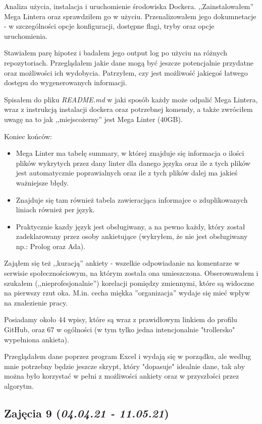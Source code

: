 \documentclass[graybox]{svmult}
\begin{document}
Analiza użycia, instalacja i uruchomienie środowiska Dockera. ,,Zainstalowałem'' Mega Lintera oraz sprawdziłem go w użyciu. Przenalizowałem jego dokumnetacje - w szczególności opcje konfiguracji, dostępne flagi, tryby oraz opcje uruchomienia.

Stawiałem parę hipotez i badałem jego output log po użyciu na różnych repozytoriach. Przeglądałem jakie dane mogą być jeszcze potencjalnie przydatne oraz możliwości ich wydobycia. Patrzyłem, czy jest możliwość jakiegoś łatwego dostępu do wygenerowanych informacji. 

Spisałem do pliku \emph{README.md} w jaki sposób każdy może odpalić Mega Lintera, wraz z instrukcją instalacji dockera oraz potrzebnej komendy, a także zwróciłem uwagę na to jak ,,miejscożerny'' jest Mega Linter (40GB). 

Koniec końców:

\begin{itemize}
  \item Mega Linter ma tabelę summary, w której znajduje się informacja o ilości plików wykrytych przez dany linter dla danego języka oraz ile z tych plików jest automatycznie poprawialnych oraz ile z tych plików dalej ma jakieś ważniejsze błędy.
  \item Znajduje się tam również tabela zawieracjąca informajce o zduplikowanych liniach również per język.
  \item Praktycznie kazdy język jest obsługiwany, a na pewno każdy, który został zadeklarowany przez osoby ankietujące (wykryłem, że nie jest obsługiwany np.: Prolog oraz Ada).
\end{itemize}

Zająłem się też ,,kuracją'' ankiety - wszelkie odpowiadanie na komentarze w serwisie społecznościowym, na którym została ona umieszczona. Obserowawałem i szukałem (,,nieprofesjonalnie'') korelacji pomiędzy zmiennymi, które są widoczne na pierwszy rzut oka. M.in. cecha miękka ''organizacja'' wydaje się mieć wpływ na znalezienie pracy.

Posiadamy około 44 wpisy, które są wraz z prawidłowym linkiem do profilu GitHub, oraz 67 w ogólności (w tym tylko jedna intencjonalnie "trollersko" wypełniona ankieta).

Przeglądałem dane poprzez program Excel i wydają się w porządku, ale według mnie potrzebny będzie jeszcze skrypt, który "dopasuje" idealnie dane, tak aby można było korzystać w pełni z możliwości ankiety oraz w przyszłości przez algorytm.


\subsection{Zajęcia 9 (\emph{04.04.21 - 11.05.21})}
\end{document}
